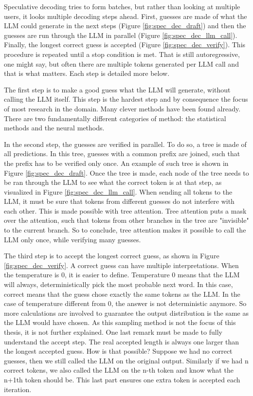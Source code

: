 Speculative decoding tries to form batches, but rather than looking at multiple users, it looks multiple decoding steps ahead. First, guesses are made of what the LLM could generate in the next steps (Figure \ref{fig:spec_dec_draft}) and then the guesses are run through the LLM in parallel (Figure \ref{fig:spec_dec_llm_call}). Finally, the longest correct guess is accepted (Figure \ref{fig:spec_dec_verify}). This procedure is repeated until a stop condition is met. That is still autoregressive, one might say, but often there are multiple tokens generated per LLM call and that is what matters. Each step is detailed more below.

The first step is to make a good guess what the LLM will generate, without calling the LLM itself. This step is the hardest step and by consequence the focus of most research in the domain. Many clever methods have been found already. There are two fundamentally different categories of method: the statistical methods and the neural methods.

In the second step, the guesses are verified in parallel. To do so, a tree is made of all predictions. In this tree, guesses with a common prefix are joined, such that the prefix has to be verified only once. An example of such tree is shown in Figure \ref{fig:spec_dec_draft}. Once the tree is made, each node of the tree needs to be ran through the LLM to see what the correct token is at that step, as visualized in Figure \ref{fig:spec_dec_llm_call}. When sending all tokens to the LLM, it must be sure that tokens from different guesses do not interfere with each other. This is made possible with tree attention. Tree attention puts a mask over the attention, such that tokens from other branches in the tree are "invisible" to the current branch. So to conclude, tree attention makes it possible to call the LLM only once, while verifying many guesses.

The third step is to accept the longest correct guess, as shown in Figure \ref{fig:spec_dec_verify}. A correct guess can have multiple interpretations. When the temperature is 0, it is easier to define. Temperature 0 means that the LLM will always, deterministically pick the most probable next word. In this case, correct means that the guess chose exactly the same tokens as the LLM. In the case of temperature different from 0, the answer is not deterministic anymore. So more calculations are involved to guarantee the output distribution is the same as the LLM would have chosen. As this sampling method is not the focus of this thesis, it is not further explained. One last remark must be made to fully understand the accept step. The real accepted length is always one larger than the longest accepted guess. How is that possible? Suppose we had no correct guesses, then we still called the LLM on the original output. Similarly if we had n correct tokens, we also called the LLM on the n-th token and know what the n+1th token should be. This last part ensures one extra token is accepted each iteration.

